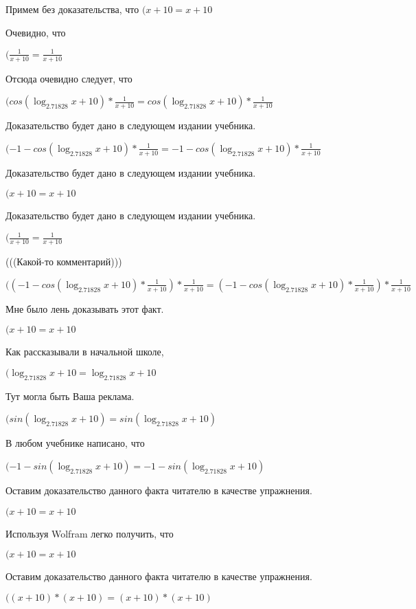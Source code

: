 \documentclass[12pt,a4paper,fleqn]{article}
\theoremstyle{definition}
\begin{document}
Примем без доказательства, что
$( x  +  10  =  x  +  10 $

Очевидно, что

$(\frac{ 1 }{ x  +  10 }
 = \frac{ 1 }{ x  +  10 }
$

Отсюда очевидно следует, что

$(cos(\log_{ 2.71828 }{ x  +  10 }) * \frac{ 1 }{ x  +  10 }
 = cos(\log_{ 2.71828 }{ x  +  10 }) * \frac{ 1 }{ x  +  10 }
$

Доказательство будет дано в следующем издании учебника.

$( -1  - cos(\log_{ 2.71828 }{ x  +  10 }) * \frac{ 1 }{ x  +  10 }
 =  -1  - cos(\log_{ 2.71828 }{ x  +  10 }) * \frac{ 1 }{ x  +  10 }
$

Доказательство будет дано в следующем издании учебника.

$( x  +  10  =  x  +  10 $

Доказательство будет дано в следующем издании учебника.

$(\frac{ 1 }{ x  +  10 }
 = \frac{ 1 }{ x  +  10 }
$

(((Какой-то комментарий)))

$(( -1  - cos(\log_{ 2.71828 }{ x  +  10 }) * \frac{ 1 }{ x  +  10 }
) * \frac{ 1 }{ x  +  10 }
 = ( -1  - cos(\log_{ 2.71828 }{ x  +  10 }) * \frac{ 1 }{ x  +  10 }
) * \frac{ 1 }{ x  +  10 }
$

Мне было лень доказывать этот факт.

$( x  +  10  =  x  +  10 $

Как рассказывали в начальной школе,

$(\log_{ 2.71828 }{ x  +  10 } = \log_{ 2.71828 }{ x  +  10 }$

Тут могла быть Ваша реклама.

$(sin(\log_{ 2.71828 }{ x  +  10 }) = sin(\log_{ 2.71828 }{ x  +  10 })$

В любом учебнике написано, что

$( -1  - sin(\log_{ 2.71828 }{ x  +  10 }) =  -1  - sin(\log_{ 2.71828 }{ x  +  10 })$

Оставим доказательство данного факта читателю в качестве упражнения.

$( x  +  10  =  x  +  10 $

Используя Wolfram легко получить, что

$( x  +  10  =  x  +  10 $

Оставим доказательство данного факта читателю в качестве упражнения.

$(( x  +  10 ) * ( x  +  10 ) = ( x  +  10 ) * ( x  +  10 )$
\end{document}
